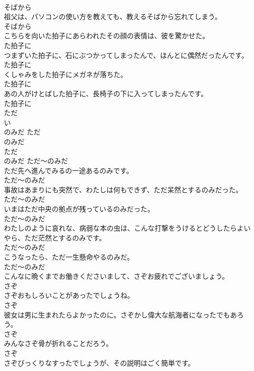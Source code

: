 \documentclass[8pt]{extreport}
\begin{document}
\begin{CJK}{UTF8}{min}
\\	そばから
\\	祖父は、パソコンの使い方を教えても、教えるそばから忘れてしまう。	
\\	そばから
\\	こちらを向いた拍子にあらわれたその顔の表情は、彼を驚かせた。	
\\	た拍子に
\\	つまずいた拍子に、石にぶつかってしまったんで、ほんとに偶然だったんです。	
\\	た拍子に
\\	くしゃみをした拍子にメガネが落ちた。	
\\	た拍子に
\\	あの人がけとばした拍子に、長椅子の下に入ってしまったんです。	
\\	た拍子に
\\	ただ 
\\	い
\\	のみだ	ただ 
\\	のみだ	
\\	ただ 
\\	のみだ	ただ～のみだ
\\	ただ先へ進んでみるの一途あるのみです。	
\\	ただ～のみだ
\\	事故はあまりにも突然で、わたしは何もできず、ただ呆然とするのみだった。	
\\	ただ～のみだ
\\	いまはただ中央の拠点が残っているのみだった。	
\\	ただ～のみだ
\\	わたしのように哀れな、病弱な本の虫は、こんな打撃をうけるとどうしたらよいやら、ただ茫然とするのみです。	
\\	ただ～のみだ
\\	こうなったら、ただ一生懸命やるのみだ。	
\\	ただ～のみだ
\\	こんなに晩くまでお働きくださいまして、さぞお疲れでございましょう。	
\\	さぞ
\\	さぞおもしろいことがあったでしょうね。	
\\	さぞ
\\	彼女は男に生まれたらよかったのに。さぞかし偉大な航海者になったでもあろう。	
\\	さぞ
\\	みんなさぞ骨が折れることだろう。	
\\	さぞ
\\	さぞびっくりなすったでしょうが、その説明はごく簡単です。	

\end{CJK}
\end{document}
